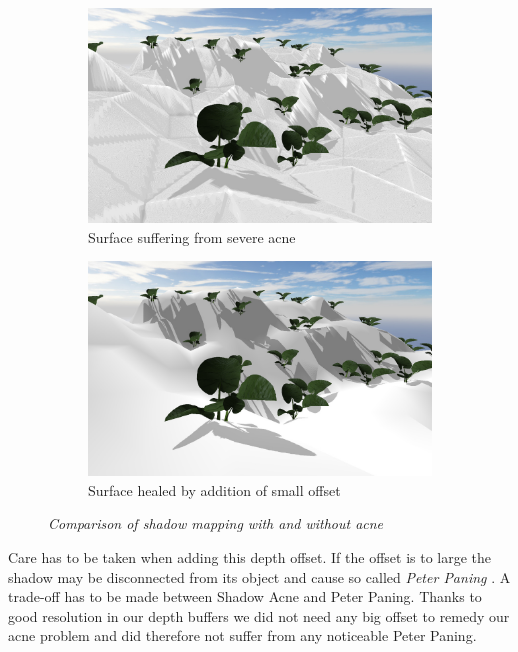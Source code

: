 \begin{figure}[H]
\begin{subfigure}{.5\textwidth}
  \centering
  \includegraphics[width=0.9\linewidth]{images/SMAcne.jpg}
  \caption{Surface suffering from severe acne}
  \label{fig:SMAcne}
\end{subfigure}%
\begin{subfigure}{.5\textwidth}
  \centering
  \includegraphics[width=0.9\linewidth]{images/SMAcneFix.jpg}
  \caption{Surface healed by addition of small offset}
  \label{fig:SMAcneFix}
\end{subfigure}
\caption[Shadow mapping, acne comparison]{\textit{Comparison of shadow mapping with and without acne}}
\label{fig:AcneComparison}
\end{figure}

Care has to be taken when adding this depth offset. If the offset is to large the shadow may be disconnected from its object and cause so called \textit{Peter Paning} \cite{ImprovedShadowMapping}. A trade-off has to be made between Shadow Acne and Peter Paning. Thanks to good resolution in our depth buffers we did not need any big offset to remedy our acne problem and did therefore not suffer from any noticeable Peter Paning. 

